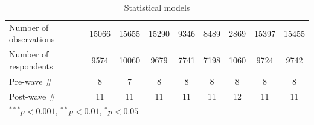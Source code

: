\documentclass[12pt, letter]{article}
\begin{document}
\begin{table}
\begin{center}
{\begin{tabular}{l c c c c c c c c }
\hline
Number of observations           & 15066          & 15655          & 15290          & 9346           & 8489           & 2869           & 15397          & 15455          \\
Number of respondents & 9574 & 10060 & 9679 & 7741 & 7198 & 1060 & 9724 & 9742 \\ 
Pre-wave \# & 8 & 7 & 8 & 8 & 8 & 8 & 8 & 8 \\  
Post-wave \# & 11 & 11 & 11 & 11 & 11 & 12 & 11 & 11 \\ 
\toprule[1.5pt]
\multicolumn{9}{l}{\scriptsize{$^{***}p<0.001$, $^{**}p<0.01$, $^*p<0.05$}}
\end{tabular}}
\caption{Statistical models}
\end{center}
\end{table}


\printbibliography
\end{document}
